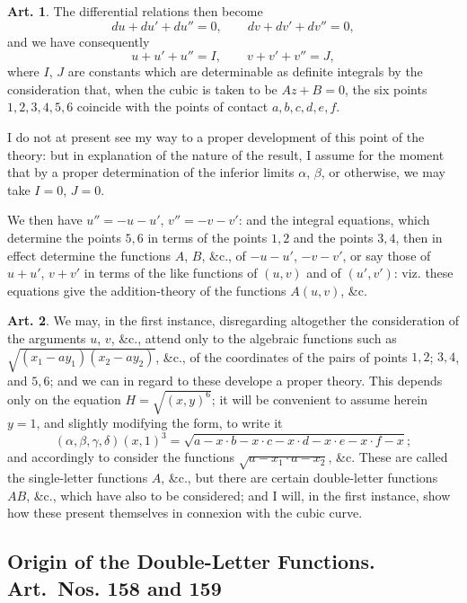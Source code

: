 \documentclass[11pt,a4paper]{article}
\theoremstyle{definition}
\newtheorem{art}{Art.}[section]
\begin{document}
\begin{art}
The differential relations then become
\[
du + du' + du'' = 0, \qquad dv + dv' + dv'' = 0,
\]
and we have consequently
\[
u + u' + u'' = I, \qquad v + v' + v'' = J,
\]
where $I$, $J$ are constants which are determinable as definite integrals by the consideration that, when the cubic is taken to be $Az + B = 0$, the six points $1,2,3,4,5,6$ coincide with the points of contact $a,b,c,d,e,f$.

I do not at present see my way to a proper development of this point of the theory: but in explanation of the nature of the result, I assume for the moment that by a proper determination of the inferior limits $\alpha$, $\beta$, or otherwise, we may take $I=0$, $J=0$.

We then have $u'' = -u - u'$, $v'' = -v - v'$: and the integral equations, which determine the points $5,6$ in terms of the points $1,2$ and the points $3,4$, then in effect determine the functions $A$, $B$, \&c., of $-u-u'$, $-v-v'$, or say those of $u+u'$, $v+v'$ in terms of the like functions of $(u,v)$ and of $(u',v')$: viz. these equations give the addition-theory of the functions $A(u,v)$, \&c.
\end{art}

\begin{art}
We may, in the first instance, disregarding altogether the consideration of the arguments $u$, $v$, \&c., attend only to the algebraic functions such as $\sqrt{(x_1-ay_1)(x_2-ay_2)}$, \&c., of the coordinates of the pairs of points $1,2$; $3,4$, and $5,6$; and we can in regard to these develope a proper theory. This depends only on the equation $H = \sqrt{(x,y)^6}$; it will be convenient to assume herein $y=1$, and slightly modifying the form, to write it
\[
(\alpha,\beta,\gamma,\delta)(x,1)^3 = \sqrt{a-x \cdot b-x \cdot c-x \cdot d-x \cdot e-x \cdot f-x};
\]
and accordingly to consider the functions $\sqrt{a-x_1 \cdot a-x_2}$, \&c. These are called the single-letter functions $A$, \&c., but there are certain double-letter functions $AB$, \&c., which have also to be considered; and I will, in the first instance, show how these present themselves in connexion with the cubic curve.
\end{art}

\subsection*{Origin of the Double-Letter Functions. Art.~Nos. 158 and 159}
\end{document}
